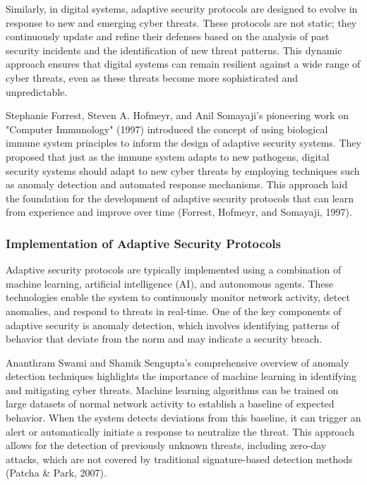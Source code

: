 \documentclass[12pt,twoside]{article}
\begin{document}
Similarly, in digital systems, adaptive security protocols are designed to evolve in response to new and emerging cyber threats. These protocols are not static; they continuously update and refine their defenses based on the analysis of past security incidents and the identification of new threat patterns. This dynamic approach ensures that digital systems can remain resilient against a wide range of cyber threats, even as these threats become more sophisticated and unpredictable.

Stephanie Forrest, Steven A. Hofmeyr, and Anil Somayaji's pioneering work on "Computer Immunology" (1997) introduced the concept of using biological immune system principles to inform the design of adaptive security systems. They proposed that just as the immune system adapts to new pathogens, digital security systems should adapt to new cyber threats by employing techniques such as anomaly detection and automated response mechanisms. This approach laid the foundation for the development of adaptive security protocols that can learn from experience and improve over time (Forrest, Hofmeyr, and Somayaji, 1997).

\subsubsection{Implementation of Adaptive Security Protocols}

Adaptive security protocols are typically implemented using a combination of machine learning, artificial intelligence (AI), and autonomous agents. These technologies enable the system to continuously monitor network activity, detect anomalies, and respond to threats in real-time. One of the key components of adaptive security is anomaly detection, which involves identifying patterns of behavior that deviate from the norm and may indicate a security breach.

Ananthram Swami and Shamik Sengupta's comprehensive overview of anomaly detection techniques highlights the importance of machine learning in identifying and mitigating cyber threats. Machine learning algorithms can be trained on large datasets of normal network activity to establish a baseline of expected behavior. When the system detects deviations from this baseline, it can trigger an alert or automatically initiate a response to neutralize the threat. This approach allows for the detection of previously unknown threats, including zero-day attacks, which are not covered by traditional signature-based detection methods (Patcha & Park, 2007).
\end{document}
